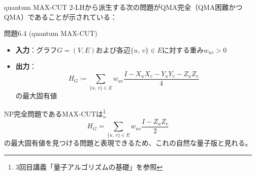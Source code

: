 \documentclass[11pt,aspectratio=169,xcolor=dvipsnames,table,dvipdfmx]{beamer}
\theoremstyle{definition}
\begin{document}
\begin{frame}{quantum MAX-CUT}
  \small2-LHから派生する次の問題がQMA完全（QMA困難かつQMA）であることが示されている：
  \begin{exampleblock}{問題6.4 (quantum MAX-CUT)}
    \begin{itemize}
      \item \textbf{入力}：グラフ$G=(V,E)$および各辺$\{u,\,v\}\in E$に対する重み$w_{uv}>0$
      \item \textbf{出力}：
            \begin{equation}
              H_{G}\coloneqq \sum_{\{u,\,v\}\in E} w_{uv}\frac{I-X_uX_v - Y_uY_v - Z_uZ_v}{4}
            \end{equation}
            の最大固有値
    \end{itemize}
  \end{exampleblock}
  \small{NP完全問題であるMAX-CUTは\footnote{3回目講義「量子アルゴリズムの基礎」を参照}
    \begin{equation}
      H_G = \sum_{\{u,\,v\}\in E} w_{uv}\frac{I-Z_uZ_v}{2}
    \end{equation}
    の最大固有値を見つける問題と表現できるため、これの自然な量子版と見れる。}
\end{frame}

\end{document}

